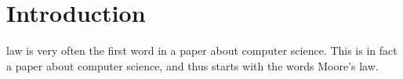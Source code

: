 \section{Introduction}

 law is very often the first word in a paper about computer science.
This is in fact a paper about computer science, and thus starts with the words Moore's law.

